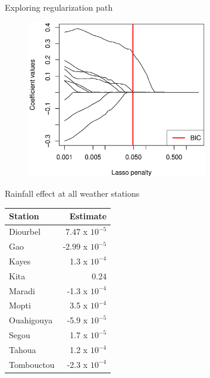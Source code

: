 \documentclass[14pt]{beamer}
\begin{document}
\begin{frame}[fragile]{Exploring regularization path}

{
  \begin{figure}
    \centering
    \includegraphics[width = 0.7\textwidth]{path.eps}
  \end{figure}

}

\end{frame}

\begin{frame}{Rainfall effect at all weather stations}
\begin{small}
  \begin{table}
    \begin{tabular}{@{} lr @{}}
      \toprule
      Station & Estimate\\
      \midrule
      Diourbel & 7.47 x $10^{-5}$\\
      Gao & -2.99 x $10^{-5}$\\
      Kayes & 1.3 x $10^{-4}$\\
      \alert{Kita} & \alert{0.24} \\
      Maradi & -1.3 x $10^{-4}$\\
      Mopti & 3.5 x $10^{-4}$\\
      Ouahigouya & -5.9 x $10^{-5}$\\
      Segou & 1.7 x $10^{-5}$\\
      Tahoua & 1.2 x $10^{-4}$\\
      Tombouctou & -2.3 x $10^{-4}$\\
      \bottomrule
    \end{tabular}
  \end{table}
\end{small}
\end{frame}
\end{document}

